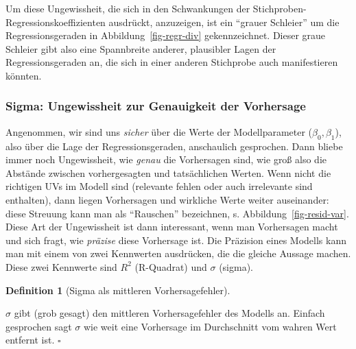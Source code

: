\documentclass[
  ngerman,
  letterpaper,
  twoside,
  open=any]{scrbook}
\theoremstyle{definition}
\theoremstyle{plain}
\theoremstyle{definition}
\theoremstyle{definition}
\newtheorem{definition}{Definition}[chapter]
\theoremstyle{remark}
\begin{document}
Um diese Ungewissheit, die sich in den Schwankungen der
Stichproben-Regressionskoeffizienten ausdrückt, anzuzeigen, ist ein
\enquote{grauer Schleier} um die Regressionsgeraden in
Abbildung~\ref{fig-regr-div} gekennzeichnet. Dieser graue Schleier gibt
also eine Spannbreite anderer, plausibler Lagen der Regressionsgeraden
an, die sich in einer anderen Stichprobe auch manifestieren könnten.

\subsubsection{Sigma: Ungewissheit zur Genauigkeit der
Vorhersage}\label{sigma-ungewissheit-zur-genauigkeit-der-vorhersage}

Angenommen, wir sind uns \emph{sicher} über die Werte der
Modellparameter (\(\beta_0, \beta_1\)), also über die Lage der
Regressionsgeraden, anschaulich gesprochen. Dann bliebe immer noch
Ungewissheit, wie \emph{genau} die Vorhersagen sind, wie groß also die
Abstände zwischen vorhergesagten und tatsächlichen Werten. Wenn nicht
die richtigen UVs im Modell sind (relevante fehlen oder auch irrelevante
sind enthalten), dann liegen Vorhersagen und wirkliche Werte weiter
auseinander: diese Streuung kann man als \enquote{Rauschen} bezeichnen,
s. Abbildung~\ref{fig-resid-var}. Diese Art der Ungewissheit ist dann
interessant, wenn man Vorhersagen macht und sich fragt, wie
\emph{präzise} diese Vorhersage ist. Die Präzision eines Modells kann
man mit einem von zwei Kennwerten ausdrücken, die die gleiche Aussage
machen. Diese zwei Kennwerte sind \(R^2\) (R-Quadrat) und \(\sigma\)
(sigma).

\begin{definition}[Sigma als mittleren
Vorhersagefehler]\protect\hypertarget{def-sigma}{}\label{def-sigma}

\(\sigma\) gibt (grob gesagt) den mittleren Vorhersagefehler des Modells
an. Einfach gesprochen sagt \(\sigma\) wie weit eine Vorhersage im
Durchschnitt vom wahren Wert entfernt ist. \(\square\)

\end{definition}
\end{document}
